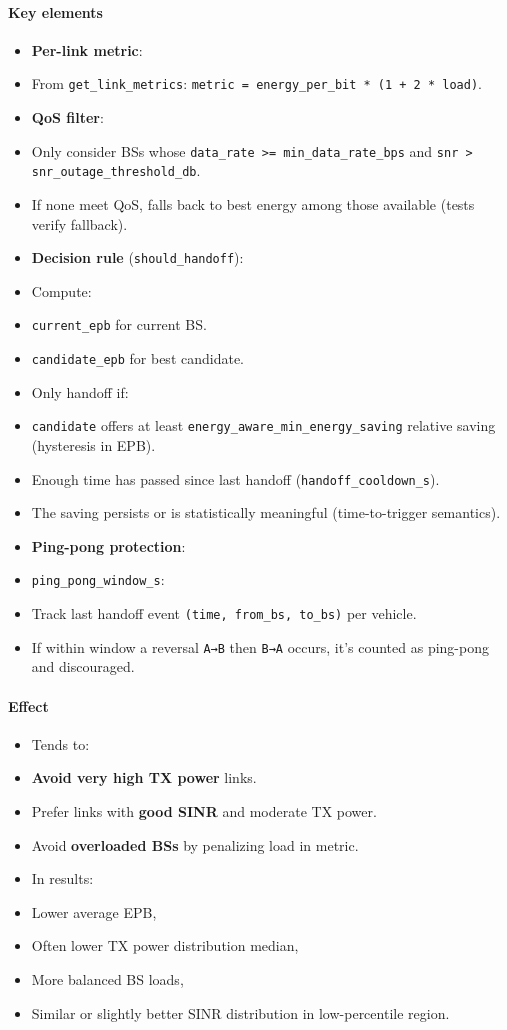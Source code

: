 \documentclass[conference]{IEEEtran}
\begin{document}
\paragraph*{Key elements}
\begin{itemize}
\item \textbf{Per-link metric}:
\item From \texttt{get\_link\_metrics}: \texttt{metric = energy\_per\_bit * (1 + 2 * load)}.
\item \textbf{QoS filter}:
\item Only consider BSs whose \texttt{data\_rate >= min\_data\_rate\_bps} and \texttt{snr > snr\_outage\_threshold\_db}.
\item If none meet QoS, falls back to best energy among those available (tests verify fallback).
\item \textbf{Decision rule} (\texttt{should\_handoff}):
\item Compute:
\item \texttt{current\_epb} for current BS.
\item \texttt{candidate\_epb} for best candidate.
\item Only handoff if:
\item \texttt{candidate} offers at least \texttt{energy\_aware\_min\_energy\_saving} relative saving (hysteresis in EPB).
\item Enough time has passed since last handoff (\texttt{handoff\_cooldown\_s}).
\item The saving persists or is statistically meaningful (time-to-trigger semantics).
\item \textbf{Ping-pong protection}:
\item \texttt{ping\_pong\_window\_s}:
\item Track last handoff event \texttt{(time, from\_bs, to\_bs)} per vehicle.
\item If within window a reversal \texttt{A→B} then \texttt{B→A} occurs, it’s counted as ping-pong and discouraged.
\end{itemize}

\paragraph*{Effect}
\begin{itemize}
\item Tends to:
\item \textbf{Avoid very high TX power} links.
\item Prefer links with \textbf{good SINR} and moderate TX power.
\item Avoid \textbf{overloaded BSs} by penalizing load in metric.
\item In results:
\item Lower average EPB,
\item Often lower TX power distribution median,
\item More balanced BS loads,
\item Similar or slightly better SINR distribution in low-percentile region.
\end{itemize}
\end{document}
